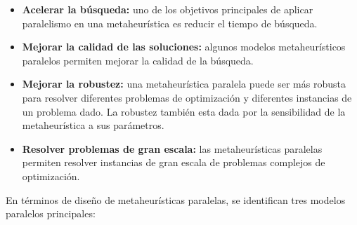 \begin{itemize}
    \item \textbf{Acelerar la búsqueda:} uno de los objetivos principales de aplicar paralelismo en una metaheurística es reducir el tiempo de búsqueda.
    
    \item \textbf{Mejorar la calidad de las soluciones:} algunos modelos metaheurísticos paralelos permiten mejorar la calidad de la búsqueda.
    
    \item \textbf{Mejorar la robustez:} una metaheurística paralela puede ser más robusta para resolver diferentes problemas de optimización y diferentes instancias de un problema dado. La robustez también esta dada por la sensibilidad de la metaheurística a sus parámetros.
    
    \item \textbf{Resolver problemas de gran escala:} las metaheurísticas paralelas permiten resolver instancias de gran escala de problemas complejos de optimización.
    
\end{itemize}


En términos de diseño de metaheurísticas paralelas, se identifican tres modelos paralelos principales:

